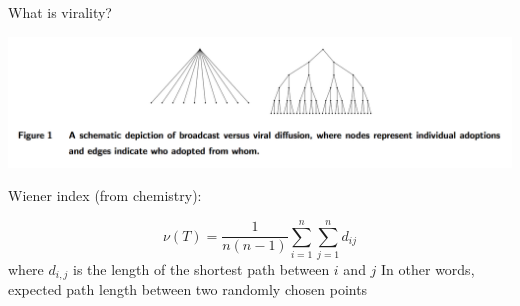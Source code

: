 \documentclass[aspectratio=169]{beamer}
\def\vf{\vfill}
\begin{document}
\begin{frame}

What is virality?

\begin{center}
\includegraphics[width=1\textwidth]{figures/goel_structural_2016_fig1}
\end{center}

\end{frame}
\begin{frame}

Wiener index (from chemistry):

\begin{equation*}
\nu(T) = \frac{1}{n(n-1)}\sum_{i = 1}^n \sum_{j=1}^n d_{ij}
\end{equation*}
where $d_{i,j}$ is the length of the shortest path between $i$ and $j$ 
\vf
In other words, expected path length between two randomly chosen points


\end{frame}
\end{document}
